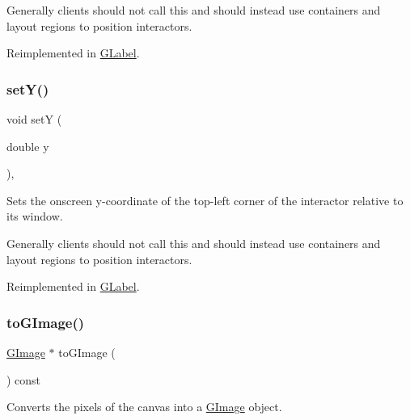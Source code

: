Generally clients should not call this and should instead use containers and layout regions to position interactors. 

Reimplemented in \mbox{\hyperlink{classGLabel_a173837ba805eaa2411e88834869d3a9c}{G\+Label}}.

\mbox{\label{classGInteractor_a7d57e2a5c35d27feb58fd498a3cf82b9}} 
\subsubsection{\texorpdfstring{set\+Y()}{setY()}}
{\footnotesize\ttfamily void setY (\begin{DoxyParamCaption}\item[{double}]{y }\end{DoxyParamCaption})\hspace{0.3cm}{\ttfamily [virtual]}, {\ttfamily [inherited]}}



Sets the onscreen y-\/coordinate of the top-\/left corner of the interactor relative to its window. 

Generally clients should not call this and should instead use containers and layout regions to position interactors. 

Reimplemented in \mbox{\hyperlink{classGLabel_a0b738606c7aca5c472b66c4e55b3c685}{G\+Label}}.

\mbox{\label{classGCanvas_aa2b5affed24054a09bddfe568d11200b}} 
\subsubsection{\texorpdfstring{to\+G\+Image()}{toGImage()}}
{\footnotesize\ttfamily \mbox{\hyperlink{classGImage}{G\+Image}} $\ast$ to\+G\+Image (\begin{DoxyParamCaption}{ }\end{DoxyParamCaption}) const\hspace{0.3cm}{\ttfamily [virtual]}}



Converts the pixels of the canvas into a \mbox{\hyperlink{classGImage}{G\+Image}} object. 

\mbox{\label{classGCanvas_a2f9b15856aaf66aa95cfd7405bd972cc}} 
